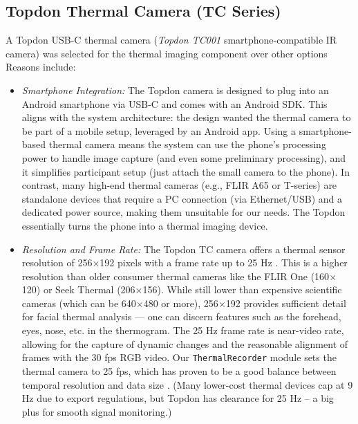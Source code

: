 \subsection{Topdon Thermal Camera (TC Series)}
A Topdon USB-C thermal camera (\textit{Topdon TC001} smartphone-compatible IR camera) was selected for the thermal imaging component over other options Reasons include:
\begin{itemize}
    \item \emph{Smartphone Integration:} The Topdon camera is designed to plug into an Android smartphone via USB-C and comes with an Android SDK. This aligns with the system architecture: the design wanted the thermal camera to be part of a mobile setup, leveraged by an Android app. Using a smartphone-based thermal camera means the system can use the phone's processing power to handle image capture (and even some preliminary processing), and it simplifies participant setup (just attach the small camera to the phone). In contrast, many high-end thermal cameras (e.g., FLIR A65 or T-series) are standalone devices that require a PC connection (via Ethernet/USB) and a dedicated power source, making them unsuitable for our needs. The Topdon essentially turns the phone into a thermal imaging device.
    \item \emph{Resolution and Frame Rate:} The Topdon TC camera offers a thermal sensor resolution of 256$\times$192 pixels with a frame rate up to 25 Hz \cite{ref20}. This is a higher resolution than older consumer thermal cameras like the FLIR One (160$\times$120) or Seek Thermal (206$\times$156). While still lower than expensive scientific cameras (which can be 640$\times$480 or more), 256$\times$192 provides sufficient detail for facial thermal analysis — one can discern features such as the forehead, eyes, nose, etc. in the thermogram. The 25 Hz frame rate is near-video rate, allowing for the capture of dynamic changes and the reasonable alignment of frames with the 30 fps RGB video. Our \texttt{ThermalRecorder} module sets the thermal camera to 25 fps, which has proven to be a good balance between temporal resolution and data size \cite{ref20}. (Many lower-cost thermal devices cap at 9 Hz due to export regulations, but Topdon has clearance for 25 Hz -- a big plus for smooth signal monitoring.)

\end{itemize}
